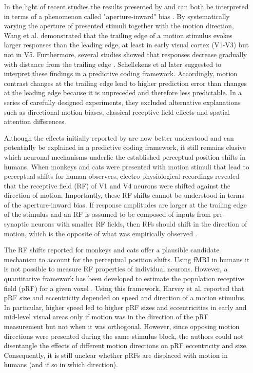 In the light of recent studies the results presented by \cite{Whitney2003} and \cite{Liu2006} can both be interpreted in terms of a phenomenon called "aperture-inward" bias \parencite{Wang2014}. By systematically varying the aperture of presented stimuli together with the motion direction, Wang et al. \parencite*{Wang2014} demonstrated that the trailing edge of a motion stimulus evokes larger responses than the leading edge, at least in early visual cortex (V1-V3) but not in V5. Furthermore, several studies showed that responses decrease gradually with distance from the trailing edge \parencite{Wang2014, Schellekens2015, Schellekens2016}. Schellekens et al \parencite*{Schellekens2016} later suggested to interpret these findings in a predictive coding framework. Accordingly, motion contrast changes at the trailing edge lead to higher prediction error than changes at the leading edge because it is unpreceded and therefore less predictable. In a series of carefully designed experiments, they excluded alternative explanations such as directional motion biases, classical receptive field effects and spatial attention differences.

Although the effects initially reported by \parencite{Whitney2003} are now better understood and can potentially be explained in a predictive coding framework, it still remains elusive which neuronal mechanisms underlie the established perceptual position shifts in humans. When monkeys and cats were presented with motion stimuli that lead to perceptual shifts for human observers, electro-physiological recordings revealed that the receptive field (RF) of V1 \parencite{Fu2004} and V4 \parencite{Sundberg2006} neurons were shifted against the direction of motion. Importantly, these RF shifts cannot be understood in terms of the aperture-inward bias. If response amplitudes are larger at the trailing edge of the stimulus and an RF is assumed to be composed of inputs from pre-synaptic neurons with smaller RF fields, then RFs should shift in the direction of motion, which is the opposite of what was empirically observed \parencite{Fu2004}.

The RF shifts reported for monkeys and cats offer a plausible candidate mechanism to account for the perceptual position shifts. Using fMRI in humans it is not possible to measure RF properties of individual neurons. However, a quantitative framework has been developed to estimate the population receptive field (pRF) for a given voxel \parencite{Dumoulin2008}. Using this framework, Harvey et al. \parencite*{Harvey2016} reported that pRF size and eccentricity depended on speed and direction of a motion stimulus. In particular, higher speed led to higher pRF sizes and eccentricities in early and mid-level visual areas only if motion was in the direction of the pRF measurement but not when it was orthogonal. However, since opposing motion directions were presented during the same stimulus block, the authors could not disentangle the effects of different motion directions on pRF eccentricity and size. Consequently, it is still unclear whether pRFs are displaced with motion in humans (and if so in which direction).

